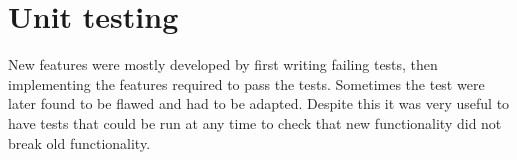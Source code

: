 \section{Unit testing}
New features were mostly developed by first writing failing tests,
then implementing the features required to pass the tests.
Sometimes the test were later found to be flawed and had to be adapted.
Despite this it was very useful to have tests that could be run at any time to check that new functionality did not break old functionality.
